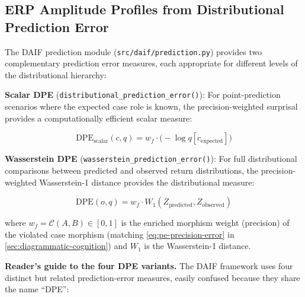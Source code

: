 \documentclass[
]{article}
\begin{document}
\subsection{ERP Amplitude Profiles from Distributional Prediction
Error}\label{sec:daif-erp}

The DAIF prediction module (\texttt{src/daif/prediction.py}) provides
two complementary prediction error measures, each appropriate for
different levels of the distributional hierarchy:

\textbf{Scalar DPE} (\texttt{distributional\_prediction\_error()}): For
point-prediction scenarios where the expected case role is known, the
precision-weighted surprisal provides a computationally efficient scalar
measure:

\begin{equation}
\mathrm{DPE}_{\text{scalar}}(c, q) = w_f \cdot \bigl(-\log q[c_{\text{expected}}]\bigr)
\label{eq:eq-7c-dpe-scalar}
\end{equation}

\textbf{Wasserstein DPE} (\texttt{wasserstein\_prediction\_error()}):
For full distributional comparisons between predicted and observed
return distributions, the precision-weighted Wasserstein-1 distance
provides the distributional measure:

\begin{equation}
\mathrm{DPE}(o, q) = w_f \cdot W_1(Z_{\text{predicted}}, Z_{\text{observed}})
\label{eq:eq-7c-dpe}
\end{equation}

where \(w_f = \mathcal{C}(A,B) \in [0,1]\) is the enriched morphism
weight (precision) of the violated case morphism (matching
\autoref{eq:pe-precision-error} in \autoref{sec:diagrammatic-cognition})
and \(W_1\) is the Wasserstein-1 distance.

\textbf{Reader's guide to the four DPE variants.} The DAIF framework
uses four distinct but related prediction-error measures, easily
confused because they share the name ``DPE'':
\end{document}
